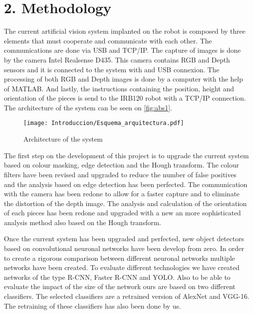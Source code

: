 {\section*{2. Methodology}
The current artificial vision system implanted on the robot is composed by three elements that must cooperate and communicate with each other. The communications are done via USB and TCP/IP. The capture of images is done by the camera Intel Realsense D435. This camera contains RGB and Depth sensors and it is connected to the system with and USB connexion. The processing of both RGB and Depth images is done by a computer with the help of MATLAB. And lastly, the instructions containing the position, height and orientation of the pieces is send to the IRB120 robot with a TCP/IP connection. The architecture of the system can be seen on \autoref{fig:abs1}.

\begin{figure}[ht]
	\centering
	\texttt{[image: Introduccion/Esquema\_arquitectura.pdf]}
	\caption{Architecture of the system}
	\label{fig:abs1}
	\vspace{-5pt}
\end{figure}

The first step on the development of this project is to upgrade the current system based on colour masking, edge detection and the Hough transform. The colour filters have been revised and upgraded to reduce the number of false positives and the analysis based on edge detection has been perfected. The communication with the camera has been redone to allow for a faster capture and to eliminate the distortion of the depth image. The analysis and calculation of the orientation of each pieces has been redone and upgraded with a new an more sophisticated analysis method also based on the Hough transform. 

Once the current system has been upgraded and perfected, new object detectors based on convolutional neuronal networks have been develop from zero. In order to create a rigorous comparison between different neuronal networks multiple networks have been created. To evaluate different technologies we have created networks of the type R-CNN, Faster R-CNN and YOLO. Also to be able to evaluate the impact of the size of the network ours are based on two different classifiers. The selected classifiers are a retrained version of AlexNet and VGG-16. The retraining of these classifiers has also been done by us.

}
